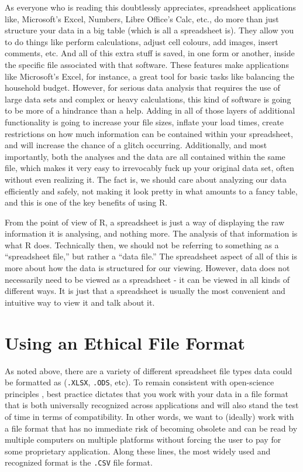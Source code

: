 As everyone who is reading this doubtlessly appreciates, spreadsheet applications like, Microsoft's Excel, Numbers, Libre Office's Calc, etc., do more than just structure your data in a big table (which is all a spreadsheet is).  They allow you to do things like perform calculations, adjust cell colours, add images, insert comments, etc. And all of this extra stuff is saved, in one form or another, inside the specific file associated with that software. These features make applications like Microsoft's Excel, for instance, a great tool for basic tasks like balancing the household budget.  However, for serious data analysis that requires the use of large data sets and complex or heavy calculations, this kind of software is going to be more of a hindrance than a help. Adding in all of those layers of additional functionality is going to increase your file sizes, inflate your load times, create restrictions on how much information can be contained within your spreadsheet, and will increase the chance of a glitch occurring. Additionally, and most importantly, both the analyses and the data are all contained within the same file, which makes it very easy to irrevocably fuck up your original data set, often without even realizing it. The fact is, we should care about analyzing our data efficiently and safely, not making it look pretty in what amounts to a fancy table, and this is one of the key benefits of using R.

From the point of view of R, a spreadsheet is just a way of displaying the raw information it is analysing, and nothing more. The analysis of that information is what R does. Technically then, we should not be referring to something as a ``spreadsheet file,'' but rather a ``data file.'' The spreadsheet aspect of all of this is more about how the data is structured for our viewing. However, data does not necessarily need to be viewed as a spreadsheet - it can be viewed in all kinds of different ways. It is just that a spreadsheet is usually the most convenient and intuitive way to view it and talk about it.

\section{Using an Ethical File Format}
\label{sec:ethical_file}

As noted above, there are a variety of different spreadsheet file types data could be formatted as (\texttt{.XLSX}, \texttt{.ODS}, etc). To remain consistent with open-science principles \parencite{UNESCO_open_sci}, best practice dictates that you work with your data in a file format that is both universally recognized across applications and will also stand the test of time in terms of compatibility.  In other words, we want to (ideally) work with a file format that has no immediate risk of becoming obsolete and can be read by multiple computers on multiple platforms without forcing the user to pay for some proprietary application. Along these lines, the most widely used and recognized format is the \texttt{.CSV} file format.

